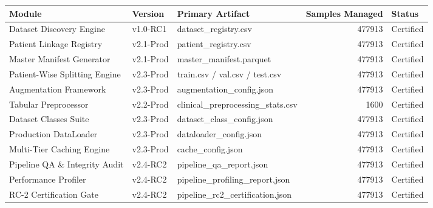 \begin{tabular}{lllrl}
\toprule
Module & Version & Primary Artifact & Samples Managed & Status \\
\midrule
Dataset Discovery Engine & v1.0-RC1 & dataset\_registry.csv & 477913 & Certified \\
Patient Linkage Registry & v2.1-Prod & patient\_registry.csv & 477913 & Certified \\
Master Manifest Generator & v2.1-Prod & master\_manifest.parquet & 477913 & Certified \\
Patient-Wise Splitting Engine & v2.3-Prod & train.csv / val.csv / test.csv & 477913 & Certified \\
Augmentation Framework & v2.3-Prod & augmentation\_config.json & 477913 & Certified \\
Tabular Preprocessor & v2.2-Prod & clinical\_preprocessing\_stats.csv & 1600 & Certified \\
Dataset Classes Suite & v2.3-Prod & dataset\_class\_config.json & 477913 & Certified \\
Production DataLoader & v2.3-Prod & dataloader\_config.json & 477913 & Certified \\
Multi-Tier Caching Engine & v2.3-Prod & cache\_config.json & 477913 & Certified \\
Pipeline QA \& Integrity Audit & v2.4-RC2 & pipeline\_qa\_report.json & 477913 & Certified \\
Performance Profiler & v2.4-RC2 & pipeline\_profiling\_report.json & 477913 & Certified \\
RC-2 Certification Gate & v2.4-RC2 & pipeline\_rc2\_certification.json & 477913 & Certified \\
\bottomrule
\end{tabular}
